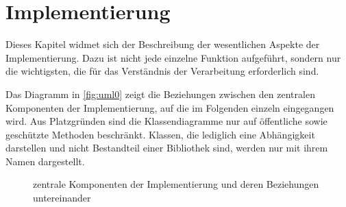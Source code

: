 \chapter{Implementierung}
Dieses Kapitel widmet sich der Beschreibung der wesentlichen Aspekte der Implementierung.
Dazu ist nicht jede einzelne Funktion aufgeführt, sondern nur die wichtigsten, die für das Verständnis der Verarbeitung erforderlich sind.

Das Diagramm in \autoref{fig:uml0} zeigt die Beziehungen zwischen den zentralen Komponenten der Implementierung, auf die im Folgenden einzeln eingegangen wird.
Aus Platzgründen sind die Klassendiagramme nur auf öffentliche sowie geschützte Methoden beschränkt.
Klassen, die lediglich eine Abhängigkeit darstellen und nicht Bestandteil einer Bibliothek sind, werden nur mit ihrem Namen dargestellt.

\begin{figure}[H]
  \centering
  \caption[zentrale Komponenten der Implementierung]{zentrale Komponenten der Implementierung und deren Beziehungen untereinander}
  \label{fig:uml0}
\end{figure}













